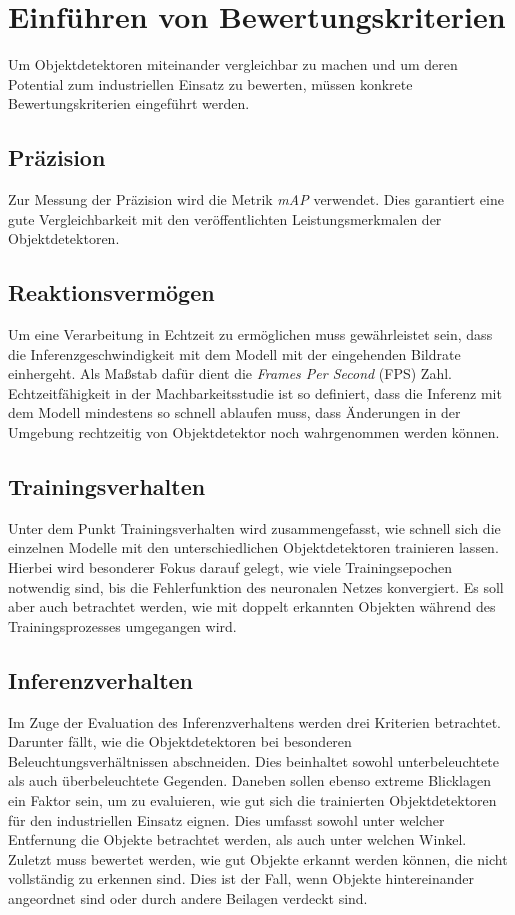 \section{Einführen von Bewertungskriterien}

Um Objektdetektoren miteinander vergleichbar zu machen und um deren Potential zum industriellen Einsatz zu bewerten, müssen konkrete Bewertungskriterien eingeführt werden.

\subsection*{Präzision}

Zur Messung der Präzision wird die Metrik \textit{mAP} verwendet. Dies garantiert eine gute Vergleichbarkeit mit den veröffentlichten Leistungsmerkmalen der Objektdetektoren.

\subsection*{Reaktionsvermögen}

Um eine Verarbeitung in Echtzeit zu ermöglichen muss gewährleistet sein, dass die Inferenzgeschwindigkeit mit dem Modell mit der eingehenden Bildrate einhergeht. Als Maßstab dafür dient die \textit{Frames Per Second} (FPS) Zahl. Echtzeitfähigkeit in der Machbarkeitsstudie ist so definiert, dass die Inferenz mit dem Modell mindestens so schnell ablaufen muss, dass Änderungen in der Umgebung rechtzeitig von Objektdetektor noch wahrgenommen werden können. 

\subsection*{Trainingsverhalten}

Unter dem Punkt Trainingsverhalten wird zusammengefasst, wie schnell sich die einzelnen Modelle mit den unterschiedlichen Objektdetektoren trainieren lassen. Hierbei wird besonderer Fokus darauf gelegt, wie viele Trainingsepochen notwendig sind, bis die Fehlerfunktion des neuronalen Netzes konvergiert. Es soll aber auch betrachtet werden, wie mit doppelt erkannten Objekten während des Trainingsprozesses umgegangen wird. 

\subsection*{Inferenzverhalten}

Im Zuge der Evaluation des Inferenzverhaltens werden drei Kriterien betrachtet. Darunter fällt, wie die Objektdetektoren bei besonderen Beleuchtungsverhältnissen abschneiden. Dies beinhaltet sowohl unterbeleuchtete als auch überbeleuchtete Gegenden. Daneben sollen ebenso extreme Blicklagen ein Faktor sein, um zu evaluieren, wie gut sich die trainierten Objektdetektoren für den industriellen Einsatz eignen. Dies umfasst sowohl unter welcher Entfernung die Objekte betrachtet werden, als auch unter welchen Winkel. Zuletzt muss bewertet werden, wie gut Objekte erkannt werden können, die nicht vollständig zu erkennen sind. Dies ist der Fall, wenn Objekte hintereinander angeordnet sind oder durch andere Beilagen verdeckt sind. 
